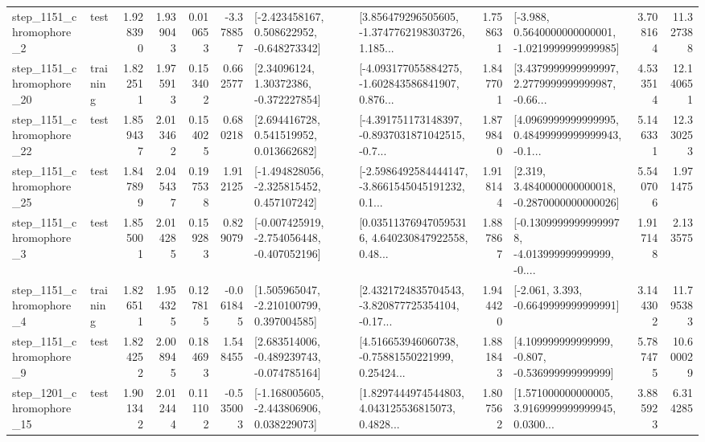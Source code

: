 \begin{tabular}{llrrrrllrlrr}
  step\_1151\_chromophore\_2 &      test &      1.928390 &    1.939043 &      0.010653 & -3.378857 &   [-2.423458167, 0.508622952, -0.648273342] &  [3.856479296505605, -1.3747762198303726, 1.185... &       1.758631 &  [-3.988, 0.5640000000000001, -1.0219999999999985] &            3.708164 &         11.327388 \\
 step\_1151\_chromophore\_20 &  training &      1.822511 &    1.975913 &      0.153402 &  0.662577 &      [2.34096124, 1.30372386, -0.372227854] &  [-4.093177055884275, -1.602843586841907, 0.876... &       1.847701 &  [3.4379999999999997, 2.2779999999999987, -0.66... &            4.533514 &         12.140651 \\
 step\_1151\_chromophore\_22 &      test &      1.859437 &    2.013462 &      0.154025 &  0.680218 &     [2.694416728, 0.541519952, 0.013662682] &  [-4.391751173148397, -0.8937031871042515, -0.7... &       1.879840 &  [4.0969999999999995, 0.48499999999999943, -0.1... &            5.146331 &         12.330253 \\
 step\_1151\_chromophore\_25 &      test &      1.847899 &    2.045437 &      0.197538 &  1.912125 &   [-1.494828056, -2.325815452, 0.457107242] &  [-2.5986492584444147, -3.8661545045191232, 0.1... &       1.918144 &   [2.319, 3.4840000000000018, -0.2870000000000026] &            5.540706 &          1.971475 \\
  step\_1151\_chromophore\_3 &      test &      1.855001 &    2.014285 &      0.159283 &  0.829079 &  [-0.007425919, -2.754056448, -0.407052196] &  [0.035113769470595316, 4.640230847922558, 0.48... &       1.887867 &  [-0.13099999999999978, -4.013999999999999, -0.... &            1.917148 &          2.133575 \\
  step\_1151\_chromophore\_4 &  training &      1.826511 &    1.954325 &      0.127815 & -0.061845 &    [1.505965047, -2.210100799, 0.397004585] &  [2.4321724835704543, -3.820877725354104, -0.17... &       1.944420 &               [-2.061, 3.393, -0.6649999999999991] &            3.144302 &         11.795383 \\
  step\_1151\_chromophore\_9 &      test &      1.824252 &    2.008945 &      0.184693 &  1.548455 &   [2.683514006, -0.489239743, -0.074785164] &  [4.516653946060738, -0.75881550221999, 0.25424... &       1.881843 &    [4.109999999999999, -0.807, -0.536999999999999] &            5.787475 &         10.600029 \\
 step\_1201\_chromophore\_15 &      test &      1.901342 &    2.012444 &      0.111102 & -0.535003 &   [-1.168005605, -2.443806906, 0.038229073] &  [1.8297444974544803, 4.043125536815073, 0.4828... &       1.807562 &  [1.571000000000005, 3.9169999999999945, 0.0300... &            3.885923 &          6.314285 \\

\end{tabular}
